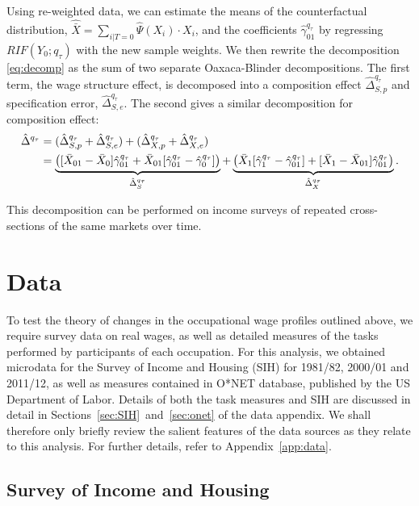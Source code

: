 Using re-weighted data, we can estimate the means of the counterfactual distribution, $\hat{\bar{X}}=\sum_{i|T=0}\hat{\Psi}(X_i) \cdot X_i$, and the coefficients $\hat{\gamma}_{01}^{q_\tau}$ by regressing $RIF(Y_0;q_\tau)$ with the new sample weights. We then rewrite the decomposition \eqref{eq:decomp} as the sum of two separate Oaxaca-Blinder decompositions. The first term, the wage structure effect, is decomposed into a composition effect $\hat{\Delta}^{q_\tau}_{S,p}$ and specification error, $\hat{\Delta}^{q_\tau}_{S,e}$. The second gives a similar decomposition for composition effect:
\begin{align}
  \hat{\Delta}^{q_\tau} &= (\hat{\Delta}^{q_\tau}_{S,p} + \hat{\Delta}^{q_\tau}_{S,e}) + (\hat{\Delta}^{q_\tau}_{X,p} + \hat{\Delta}^{q_\tau}_{X,e}) \notag \\
  &= \underbrace{\left( [\bar{X}_{01} - \bar{X}_0 ] \hat{\gamma}^{q_\tau}_{01} +
    \bar{X}_{01}[\hat{\gamma}_{01}^{q_\tau} - \hat{\gamma}_0^{q_\tau}] \right)}_{\hat{\Delta}^{q_\tau}_{S}} +
  \underbrace{\left( \bar{X}_{1}[\hat{\gamma}_{1}^{q_\tau} - \hat{\gamma}_{01}^{q_\tau}] + 
    [\bar{X}_{1} - \bar{X}_{01} ] \hat{\gamma}^{q_\tau}_{01}\right)}_{\hat{\Delta}^{q_\tau}_{X}}.
\end{align}

This decomposition can be performed on income surveys of repeated cross-sections of the same markets over time.

\section{Data}

To test the theory of changes in the occupational wage profiles outlined above, we require survey data on real wages, as well as detailed measures of the tasks performed by participants of each occupation. For this analysis, we obtained microdata for the Survey of Income and Housing (SIH) for 1981/82, 2000/01 and 2011/12, as well as measures contained in O*NET database, published by the US Department of Labor. Details of both the task measures and SIH are discussed in detail in Sections~\ref{sec:SIH}~and~\ref{sec:onet} of the data appendix. We shall therefore only briefly review the salient features of the data sources as they relate to this analysis. For further details, refer to Appendix~\ref{app:data}.

\subsection{Survey of Income and Housing}

